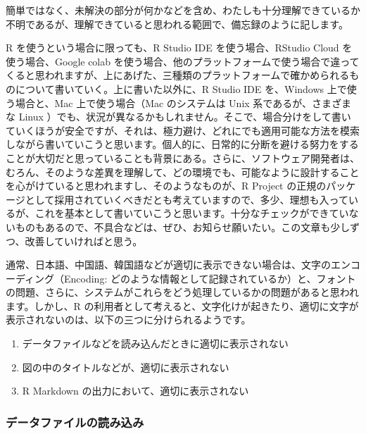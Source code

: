 \documentclass[
]{bxjsbook}
\providecommand{\tightlist}{%
  \setlength{\itemsep}{0pt}\setlength{\parskip}{0pt}}
\theoremstyle{definition}
\theoremstyle{definition}
\theoremstyle{definition}
\theoremstyle{definition}
\theoremstyle{remark}
\begin{document}
簡単ではなく、未解決の部分が何かなどを含め、わたしも十分理解できているか不明であるが、理解できていると思われる範囲で、備忘録のように記します。

R を使うという場合に限っても、R Studio IDE を使う場合、RStudio Cloud を使う場合、Google colab を使う場合、他のプラットフォームで使う場合で違ってくると思われますが、上にあげた、三種類のプラットフォームで確かめられるものについて書いていく。上に書いた以外に、R Studio IDE を、Windows 上で使う場合と、Mac 上で使う場合（Mac のシステムは Unix 系であるが、さまざまな Linux ）でも、状況が異なるかもしれません。そこで、場合分けをして書いていくほうが安全ですが、それは、極力避け、どれにでも適用可能な方法を模索しながら書いていこうと思います。個人的に、日常的に分断を避ける努力をすることが大切だと思っていることも背景にある。さらに、ソフトウェア開発者は、むろん、そのような差異を理解して、どの環境でも、可能なように設計することを心がけていると思われますし、そのようなものが、R Project の正規のパッケージとして採用されていくべきだとも考えていますので、多少、理想も入っているが、これを基本として書いていこうと思います。十分なチェックができていないものもあるので、不具合などは、ぜひ、お知らせ願いたい。この文章も少しずつ、改善していければと思う。

通常、日本語、中国語、韓国語などが適切に表示できない場合は、文字のエンコーディング（Encoding: どのような情報として記録されているか）と、フォントの問題、さらに、システムがこれらをどう処理しているかの問題があると思われます。しかし、R の利用者として考えると、文字化けが起きたり、適切に文字が表示されないのは、以下の三つに分けられるようです。

\begin{enumerate}
\def\labelenumi{\arabic{enumi}.}
\tightlist
\item
  データファイルなどを読み込んだときに適切に表示されない
\item
  図の中のタイトルなどが、適切に表示されない
\item
  R Markdown の出力において、適切に表示されない
\end{enumerate}

\hypertarget{ux30c7ux30fcux30bfux30d5ux30a1ux30a4ux30ebux306eux8aadux307fux8fbcux307f}{%
\subsubsection{データファイルの読み込み}\label{ux30c7ux30fcux30bfux30d5ux30a1ux30a4ux30ebux306eux8aadux307fux8fbcux307f}}
\end{document}

